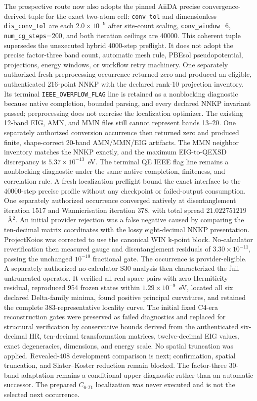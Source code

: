\documentclass[11pt]{article}
\begin{document}
The prospective route now also adopts the pinned AiiDA precise convergence-derived
tuple for the exact two-atom cell: \texttt{conv\_tol} and dimensionless
\texttt{dis\_conv\_tol} are each $2.0\times10^{-9}$ after site-count scaling,
\texttt{conv\_window}=6, \texttt{num\_cg\_steps}=200, and both iteration ceilings are
40000.  This coherent tuple supersedes the unexecuted hybrid 4000-step preflight.  It
does not adopt the precise factor-three band count, automatic mesh rule, PBEsol
pseudopotential, projections, energy windows, or workflow retry machinery.  One
separately authorized fresh preprocessing occurrence returned zero and produced an
eligible, authenticated 216-point NNKP with the declared rank-10 projection inventory.
Its terminal \texttt{IEEE\_OVERFLOW\_FLAG} line is retained as a nonblocking diagnostic
because native completion, bounded parsing, and every declared NNKP invariant passed;
preprocessing does not exercise the localization optimizer.  The existing 12-band EIG,
AMN, and MMN files still cannot represent bands 13--20.  One separately authorized
conversion occurrence then returned zero and produced finite, shape-correct 20-band
AMN/MMN/EIG artifacts.  The MMN neighbor inventory matches the NNKP exactly, and the
maximum EIG-to-QEXSD discrepancy is $5.37\times10^{-13}$~eV.  The terminal QE IEEE
flag line remains a nonblocking diagnostic under the same native-completion, finiteness,
and correlation rule.  A fresh localization preflight bound the exact interface to the
40000-step precise profile without any checkpoint or failed-output consumption.  One
separately authorized occurrence converged natively at disentanglement iteration 1517
and Wannierisation iteration 378, with total spread $21.022751219$~\AA$^2$.  An
initial provider rejection was a false negative caused by comparing the ten-decimal
matrix coordinates with the lossy eight-decimal NNKP presentation.  ProjectKoios was
corrected to use the canonical WIN k-point block.  No-calculator reverification then
measured gauge and disentanglement residuals of $3.30\times10^{-11}$, passing the
unchanged $10^{-10}$ fractional gate.  The occurrence is provider-eligible.  A
separately authorized no-calculator S30 analysis then characterized the full untruncated
operator.  It verified all real-space pairs with zero Hermiticity residual, reproduced
954 frozen states within $1.29\times10^{-9}$~eV, located all six declared Delta-family
minima, found positive principal curvatures, and retained the complete 383-representative
locality curve.  The initial fixed C4-era reconstruction gates were preserved as failed
diagnostics and replaced for structural verification by conservative bounds derived
from the authenticated six-decimal HR, ten-decimal transformation matrices, twelve-decimal
EIG values, exact degeneracies, dimensions, and energy scale.  No spatial truncation was
applied.  Revealed-408 development comparison is next; confirmation, spatial truncation,
and Slater--Koster reduction remain blocked.  The factor-three 30-band adaptation
remains a conditional upper diagnostic rather than an automatic successor.
The prepared $C_{6\text{-}T1}$ localization was never executed and is not the selected
next occurrence.
\end{document}
